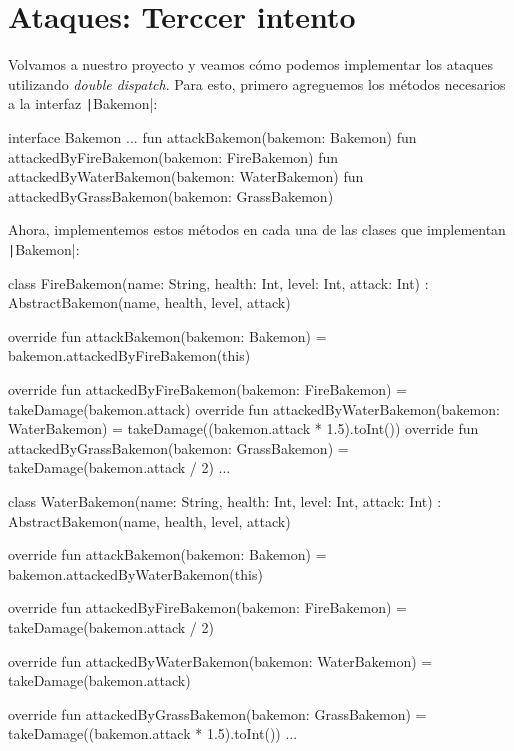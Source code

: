 \section{Ataques: Terccer intento}
  \label{sec:ataques-tercer-intento}

  Volvamos a nuestro proyecto y veamos cómo podemos implementar los ataques utilizando 
  \textit{double dispatch}.
  Para esto, primero agreguemos los métodos necesarios a la interfaz \texttt|Bakemon|:
  \begin{kotlin}
    interface Bakemon {
      ...
      fun attackBakemon(bakemon: Bakemon)
      fun attackedByFireBakemon(bakemon: FireBakemon)
      fun attackedByWaterBakemon(bakemon: WaterBakemon)
      fun attackedByGrassBakemon(bakemon: GrassBakemon)
    }
  \end{kotlin}

  Ahora, implementemos estos métodos en cada una de las clases que implementan 
  \texttt|Bakemon|:

  \begin{kotlin}
    class FireBakemon(name: String, health: Int, level: Int, attack: Int) :
        AbstractBakemon(name, health, level, attack) {
      override fun attackBakemon(bakemon: Bakemon) = bakemon.attackedByFireBakemon(this)

      override fun attackedByFireBakemon(bakemon: FireBakemon) =
        takeDamage(bakemon.attack)
      override fun attackedByWaterBakemon(bakemon: WaterBakemon) =
        takeDamage((bakemon.attack * 1.5).toInt())
      override fun attackedByGrassBakemon(bakemon: GrassBakemon) =
        takeDamage(bakemon.attack / 2)
      ...
    }
  \end{kotlin}

  \begin{kotlin}
    class WaterBakemon(name: String, health: Int, level: Int, attack: Int) :
        AbstractBakemon(name, health, level, attack) {
      override fun attackBakemon(bakemon: Bakemon) = bakemon.attackedByWaterBakemon(this)

      override fun attackedByFireBakemon(bakemon: FireBakemon) =
        takeDamage(bakemon.attack / 2)
    
      override fun attackedByWaterBakemon(bakemon: WaterBakemon) =
        takeDamage(bakemon.attack)
    
      override fun attackedByGrassBakemon(bakemon: GrassBakemon) =
        takeDamage((bakemon.attack * 1.5).toInt())
      ...
    }
  \end{kotlin}

